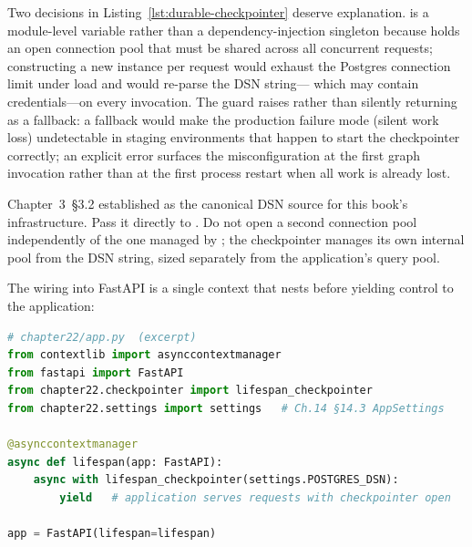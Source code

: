 Two decisions in Listing~\ref{lst:durable-checkpointer} deserve
explanation.
 is a module-level variable rather than a
dependency-injection singleton because  holds
an open connection pool that must be shared across all concurrent
requests; constructing a new instance per request would exhaust the
Postgres connection limit under load and would re-parse the DSN string---
which may contain credentials---on every invocation. The
 guard raises  rather than
silently returning  as a fallback: a fallback would
make the production failure mode (silent work loss) undetectable in
staging environments that happen to start the checkpointer correctly; an
explicit error surfaces the misconfiguration at the first graph invocation
rather than at the first process restart when all work is already lost.

\begin{notebox}
Chapter~3~\S3.2 established  as the
canonical DSN source for this book's infrastructure. Pass it directly to
. Do not open a
second  connection pool independently of the one managed by
; the checkpointer manages its own internal pool
from the DSN string, sized separately from the application's query pool.
\end{notebox}

The wiring into FastAPI is a single  context that nests
 before yielding control to the application:

\begin{lstlisting}[language=Python,
  caption={FastAPI lifespan wiring: checkpointer opens on startup and
           closes on shutdown},
  label={lst:durable-lifespan}]
# chapter22/app.py  (excerpt)
from contextlib import asynccontextmanager
from fastapi import FastAPI
from chapter22.checkpointer import lifespan_checkpointer
from chapter22.settings import settings   # Ch.14 §14.3 AppSettings

@asynccontextmanager
async def lifespan(app: FastAPI):
    async with lifespan_checkpointer(settings.POSTGRES_DSN):
        yield   # application serves requests with checkpointer open

app = FastAPI(lifespan=lifespan)
\end{lstlisting}

